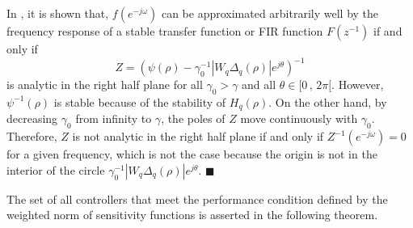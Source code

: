 \documentclass[journal]{IEEEtran}
\begin{document}
In \cite{RM94}, it is shown that, $f(e^{-j\omega})$ can be approximated arbitrarily well by the frequency response of a stable transfer function or FIR function $F(z^{-1})$ if and only if 
\begin{equation}
Z=\left( \psi(\rho) - \gamma_0 ^{-1}|W_q\Delta_q(\rho)|e^{j\theta} \right)^{-1}
\end{equation}
is analytic in the right half plane for all $\gamma_0>\gamma$ and all $\theta \in [0 \, , \, 2 \pi [$. However, $\psi^{-1}(\rho)$ is stable because of the stability of $H_q(\rho)$. On the other hand, by decreasing $\gamma_0$ from infinity to $\gamma$, the poles of $Z$ move continuously with $\gamma_0$. Therefore, $Z$ is not analytic in the right half plane if and only if $Z^{-1}(e^{-j\omega})=0$ for a given frequency, which is not the case because the origin is not in the interior of the circle $\gamma_0 ^{-1}|W_q\Delta_q(\rho)|e^{j\theta}$.  
{\hfill \ensuremath{\blacksquare}}

The set of all controllers that meet the performance condition defined by the weighted norm of sensitivity functions is asserted in the following theorem.
\end{document}
